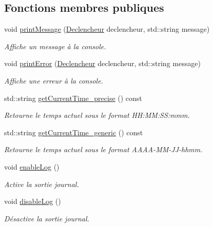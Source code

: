 \subsection*{Fonctions membres publiques}
\begin{DoxyCompactItemize}
\item 
void \hyperlink{group__inf2990_ga0d51f3d912211a1e4ff8232c04db8174}{print\-Message} (\hyperlink{class_debug_afd6ed3c50c08d0a7830cd5253b4ab8b6}{Declencheur} declencheur, std\-::string message)
\begin{DoxyCompactList}\small\item\em Affiche un message à la console. \end{DoxyCompactList}\item 
void \hyperlink{group__inf2990_ga45d10d28492f6a29f44335e0f479e1f6}{print\-Error} (\hyperlink{class_debug_afd6ed3c50c08d0a7830cd5253b4ab8b6}{Declencheur} declencheur, std\-::string message)
\begin{DoxyCompactList}\small\item\em Affiche une erreur à la console. \end{DoxyCompactList}\item 
std\-::string \hyperlink{group__inf2990_gae0f25a128c40b3019a2351d3fb1e938b}{get\-Current\-Time\-\_\-precise} () const 
\begin{DoxyCompactList}\small\item\em Retourne le temps actuel sous le format H\-H\-:\-M\-M\-:\-S\-S\-:mmm. \end{DoxyCompactList}\item 
std\-::string \hyperlink{group__inf2990_ga6de3f26eda6414f573d0c5f64f711dc3}{get\-Current\-Time\-\_\-generic} () const 
\begin{DoxyCompactList}\small\item\em Retourne le temps actuel sous le format A\-A\-A\-A-\/\-M\-M-\/\-J\-J-\/hhmm. \end{DoxyCompactList}\item 
void \hyperlink{group__inf2990_gabf9d25ff2565e30a1f481e39e4e2192f}{enable\-Log} ()
\begin{DoxyCompactList}\small\item\em Active la sortie journal. \end{DoxyCompactList}\item 
void \hyperlink{group__inf2990_ga05742456a67e8e3104a3a6d0134c58ed}{disable\-Log} ()
\begin{DoxyCompactList}\small\item\em Désactive la sortie journal. \end{DoxyCompactList}\item 

\end{DoxyCompactItemize}
